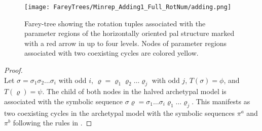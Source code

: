 \begin{figure}[h!]
	\centering
	\texttt{[image: FareyTrees/Minrep\_Adding1\_Full\_RotNum/adding.png]}
	\caption[Farey-tree showing the rotation tuples associated with the parameter regions of a horizontally oriented  structure]{
		Farey-tree showing the rotation tuples associated with the parameter regions of the horizontally oriented \gls{pal} structure marked with a red arrow in  up to four levels.
		Nodes of parameter regions associated with two coexisting cycles are colored yellow.
	}
	\label{fig:add.prop.rot.num.tree}
\end{figure}

\begin{proof} \phantom{x} \\
	Let $\sigma = \sigma_1\sigma_2 \dots \sigma_i$ with odd $i$, $\varrho = \varrho_1\varrho_2 \dots \varrho_j$ with odd $j$, $T(\sigma) = \phi$, and $T(\varrho) = \psi$.
	The child of both nodes in the halved archetypal model is associated with the symbolic sequence $\sigma\varrho = \sigma_1 \dots \sigma_i \varrho_1 \dots \varrho_j$.
	This manifests as two coexisting cycles in the archetypal model with the symbolic sequences $\pi^a$ and $\pi^b$ following the rules in .


\end{proof}

